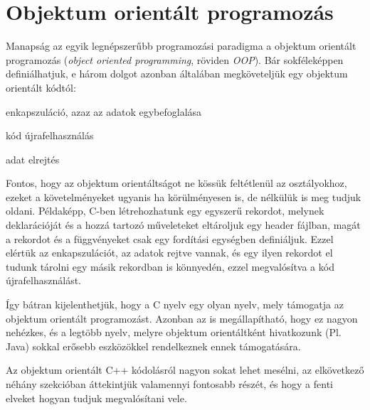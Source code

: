 \documentclass[../cpp_book/cpp_book.tex]{subfiles}
\begin{document}
	\section{Objektum orientált programozás}
	Manapság az egyik legnépszerűbb programozási paradigma a objektum orientált programozás (\textit{object oriented programming}, röviden \textit{OOP}). Bár sokféleképpen definiálhatjuk, e három dolgot azonban általában megköveteljük egy objektum orientált kódtól:
	\begin{compactitem}
		\item enkapszuláció, azaz az adatok egybefoglalása
		\item kód újrafelhasználás
		\item adat elrejtés
	\end{compactitem}
	Fontos, hogy az objektum orientáltságot ne kössük feltétlenül az osztályokhoz, ezeket a követelményeket ugyanis ha körülményesen is, de nélkülük is meg tudjuk oldani. Példaképp, C-ben létrehozhatunk egy egyszerű rekordot, melynek deklarációját és a hozzá tartozó műveleteket eltároljuk egy header fájlban, magát a rekordot és a függvényeket csak egy fordítási egységben definiáljuk. Ezzel elértük az enkapszulációt, az adatok rejtve vannak, és egy ilyen rekordot el tudunk tárolni egy másik rekordban is könnyedén, ezzel megvalósítva a kód újrafelhasználást.

	Így bátran kijelenthetjük, hogy a C nyelv egy olyan nyelv, mely támogatja az objektum orientált programozást. Azonban az is megállapítható, hogy ez nagyon nehézkes, és a legtöbb nyelv, melyre objektum orientáltként hivatkozunk (Pl. Java) sokkal erősebb eszközökkel rendelkeznek ennek támogatására.
	
	Az objektum orientált C++ kódolásról nagyon sokat lehet mesélni, az elkövetkező néhány szekcióban áttekintjük valamennyi fontosabb részét, és hogy a fenti elveket hogyan tudjuk megvalósítani vele.
\end{document}
